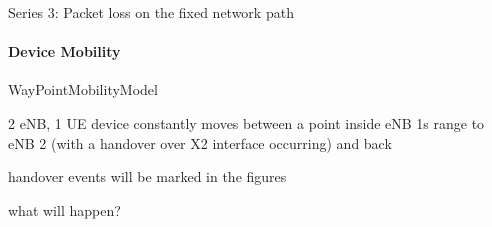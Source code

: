 Series 3: Packet loss on the fixed network path



\paragraph{Device Mobility}

WayPointMobilityModel

2 \gls{eNB}, 1 \gls{UE}
device constantly moves between a point inside eNB 1s range to eNB 2 (with a handover over X2 interface occurring) and back

handover events will be marked in the figures 

what will happen?










